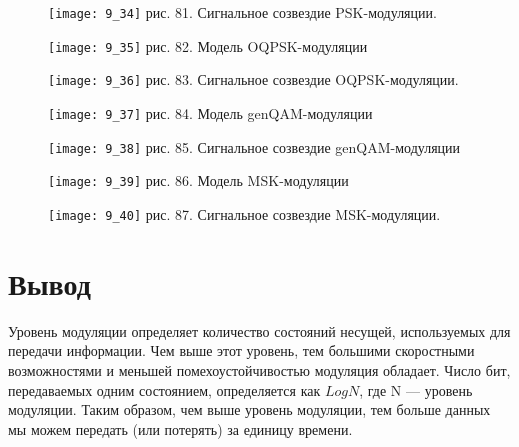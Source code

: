 \documentclass[10pt,a4paper]{report}
\begin{document}
\begin{figure}
\begin{center}
\texttt{[image: 9\_34]}\newline
рис. 81. Сигнальное созвездие PSK-модуляции.\newline
\end{center}
\end{figure}
\begin{figure}
\begin{center}
\texttt{[image: 9\_35]}\newline
рис. 82. Модель OQPSK-модуляции\newline
\end{center}
\end{figure}
\begin{figure}
\begin{center}
\texttt{[image: 9\_36]}\newline
рис. 83. Сигнальное созвездие OQPSK-модуляции.\newline
\end{center}
\end{figure}
\begin{figure}
\begin{center}
\texttt{[image: 9\_37]}\newline
рис. 84. Модель genQAM-модуляции\newline
\end{center}
\end{figure}
\begin{figure}
\begin{center}
\texttt{[image: 9\_38]}\newline
рис. 85. Сигнальное созвездие genQAM-модуляции\newline
\end{center}
\end{figure}
\begin{figure}
\begin{center}
\texttt{[image: 9\_39]}\newline
рис. 86. Модель MSK-модуляции\newline
\end{center}
\end{figure}
\begin{figure}
\begin{center}
\texttt{[image: 9\_40]}\newline
рис. 87. Сигнальное созвездие MSK-модуляции.\newline
\end{center}
\end{figure}
\section{Вывод}
Уровень модуляции определяет количество состояний несущей, используемых для передачи информации. Чем выше этот уровень, тем большими скоростными возможностями и меньшей помехоустойчивостью модуляция обладает. Число бит, передаваемых одним состоянием, определяется как $Log N$, где N — уровень модуляции. Таким образом, чем выше уровень модуляции, тем больше данных мы можем передать (или потерять) за единицу времени.
\end{document}
